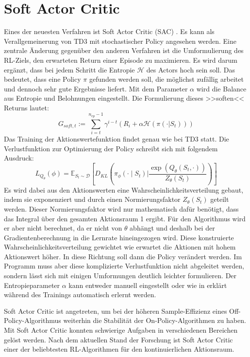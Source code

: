 \section{Soft Actor Critic}
\label{section:sac}
Eines der neuesten Verfahren ist Soft Actor Critic (SAC) \cite{haarnoja2018soft}. 
Es kann als Verallgemeinerung von TD3 mit stochastischer Policy angesehen werden.
Eine zentrale Änderung gegenüber den anderen Verfahren ist die Umformulierung des RL-Ziels, den erwarteten Return einer Episode zu maximieren.
Es wird darum ergänzt, dass bei jedem Schritt die Entropie $\mathcal{H}$ des Actors hoch sein soll.
Das bedeutet, dass eine Policy $\pi$ gefunden werden soll, die möglichst zufällig arbeitet und dennoch sehr gute Ergebnisse liefert.
Mit dem Parameter $\alpha$ wird die Balance aus Entropie und Belohnungen eingestellt.
Die Formulierung dieses >>soften<< Returns lautet:
\begin{equation}
	G_{soft,t} := \sum_{i=t}^{n_{ep} - 1} \gamma^{i - t} \left(R_i + \alpha \mathcal{H}(\pi(\cdot | S_t))\right)
\end{equation}
Das Training der Aktionswertefunktion findet genau wie bei TD3 statt.
Die Verlustfunktion zur Optimierung der Policy schreibt sich mit folgendem Ausdruck:
\begin{equation}
	L_{Q_\theta}(\phi) = \mathbb{E}_{S_t \sim \mathcal{D}} \left[D_{KL}\left(\pi_\phi(\cdot \mid S_t) | \frac{\exp(Q_\theta(S_t, \cdot))}{Z_\theta(S_t)}\right)\right]
\end{equation}
Es wird dabei aus den Aktionswerten eine Wahrscheinlichkeitsverteilung gebaut, indem sie exponenziert und durch einen Normierungsfaktor $Z_\theta(S_t)$ geteilt werden.
Dieser Normierungsfaktor wird nur mathematisch dafür benötigt, dass das Integral über den gesamten Aktionsraum 1 ergibt.
Für den Algorithmus wird er aber nicht berechnet, da er nicht von $\theta$ abhängt und deshalb bei der Gradientenberechnung in die Lernrate hineingezogen wird.
Diese konstruierte Wahrscheinlichkeitsverteilung gewichtet wie erwartet die Aktionen mit hohem Aktionswert höher.
In diese Richtung soll dann die Policy verändert werden.
Im Programm muss aber diese komplizierte Verlustfunktion nicht abgeleitet werden, sondern lässt sich mit einigen Umformungen deutlich leichter formulieren.
Der Entropieparameter $\alpha$ kann entweder manuell eingestellt oder wie in \cite{https://doi.org/10.48550/arxiv.1812.05905} erklärt während des Trainings automatisch erlernt werden.

Soft Actor Critic ist angetreten, um bei der höheren Sample-Effizienz eines Off-Policy-Algorithmus weiterhin die Stabilität der On-Policy-Algorithmen zu haben.
Mit Soft Actor Critic konnten schwierige Aufgaben in verschiedenen Bereichen gelöst werden.
Nach dem aktuellen Stand der Forschung ist Soft Actor Critic einer der beliebtesten RL-Algorithmen für den kontinuierlichen Aktionsraum.

